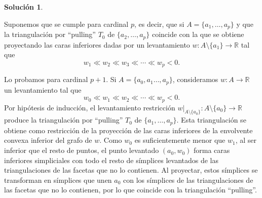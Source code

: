 \documentclass[10pt]{article}
\theoremstyle{definition}
\newtheorem*{sol}{Solución}
\newcommand{\RR}{\mathbb{R}}
\begin{document}
\begin{sol}
\begin{enumerate}[(a)]
    Suponemos que se cumple para cardinal $p$, es decir, que si $A=\{a_1,\ldots,a_p\}$ y que la triangulación por ``pulling'' $T_0$ de $\{a_2,\ldots,a_p\}$ coincide con la que se obtiene proyectando las caras inferiores dadas por un levantamiento $w:A\setminus\{a_1\}\longrightarrow \RR$ tal que \[w_1\ll w_2\ll w_3\ll\cdots\ll w_p<0.\]
    
    Lo probamos para cardinal $p+1$. Si $A=\{a_0,a_1\ldots,a_p\}$, consideramos $w:A\longrightarrow\RR$ un levantamiento tal que 
    \[w_0\ll w_1\ll w_2\ll \cdots\ll w_p<0.\]
    Por hipótesis de inducción, el levantamiento restricción $w|_{A\setminus\{a_0\}}:A\setminus\{a_0\}\longrightarrow \RR$ produce la triangulación por ``pulling'' $T_0$ de $\{a_1,\ldots,a_p\}$. Esta triangulación se obtiene como restricción de la proyección de las caras inferiores de la envolvente convexa inferior del grafo de $w$. Como $w_0$ es suficientemente menor que $w_1$,  
    al ser inferior que el resto de puntos, el punto levantado $(a_0,w_0)$ forma caras inferiores simpliciales con todo el resto de símplices levantados de las triangulaciones de las facetas que no lo contienen. Al proyectar, estos símplices se transforman en símplices que unen $a_0$ con los símplices de las triangulaciones de las facetas que no lo contienen, por lo que coincide con la triangulación ``pulling''.

\end{enumerate}

\end{sol}
\clearpage
\end{document}
